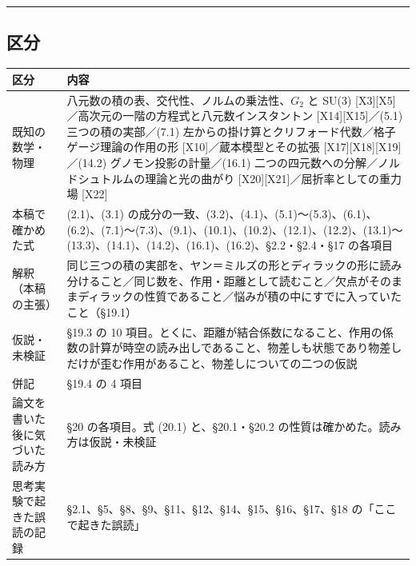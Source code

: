 \documentclass[
  a4paper,
]{ltjsarticle}
\newcounter{none} %
\begin{document}
\begin{center}\rule{0.5\linewidth}{0.5pt}\end{center}

\subsection{区分}\label{ux533aux5206}

{\def\LTcaptype{none} %
\begin{longtable}[]{@{}
  >{\raggedright\arraybackslash}p{}
  >{\raggedright\arraybackslash}p{}@{}}
\toprule\noalign{}
\begin{minipage}[b]{\linewidth}\raggedright
区分
\end{minipage} & \begin{minipage}[b]{\linewidth}\raggedright
内容
\end{minipage} \\
\midrule\noalign{}
\endhead
\bottomrule\noalign{}
\endlastfoot
既知の数学・物理 & 八元数の積の表、交代性、ノルムの乗法性、\(G_2\) と
SU(3) {[}X3{]}{[}X5{]}／高次元の一階の方程式と八元数インスタントン
{[}X14{]}{[}X15{]}／(5.1) 三つの積の実部／(7.1)
左からの掛け算とクリフォード代数／格子ゲージ理論の作用の形
{[}X10{]}／蔵本模型とその拡張 {[}X17{]}{[}X18{]}{[}X19{]}／(14.2)
グノモン投影の計量／(16.1)
二つの四元数への分解／ノルドシュトルムの理論と光の曲がり
{[}X20{]}{[}X21{]}／屈折率としての重力場 {[}X22{]} \\
本稿で確かめた式 & (2.1)、(3.1)
の成分の一致、(3.2)、(4.1)、(5.1)〜(5.3)、(6.1)、(6.2)、(7.1)〜(7.3)、(9.1)、(10.1)、(10.2)、(12.1)、(12.2)、(13.1)〜(13.3)、(14.1)、(14.2)、(16.1)、(16.2)、§2.2・§2.4・§17
の各項目 \\
解釈（本稿の主張） &
同じ三つの積の実部を、ヤン＝ミルズの形とディラックの形に読み分けること／同じ数を、作用・距離として読むこと／欠点がそのままディラックの性質であること／悩みが積の中にすでに入っていたこと（§19.1） \\
仮説・未検証 & §19.3 の 10
項目。とくに、距離が結合係数になること、作用の係数の計算が時空の読み出しであること、物差しも状態であり物差しだけが歪む作用があること、物差しについての二つの仮説 \\
併記 & §19.4 の 4 項目 \\
論文を書いた後に気づいた読み方 & §20 の各項目。式 (20.1)
と、§20.1・§20.2 の性質は確かめた。読み方は仮説・未検証 \\
思考実験で起きた誤読の記録 &
§2.1、§5、§8、§9、§11、§12、§14、§15、§16、§17、§18
の「ここで起きた誤読」 \\
\end{longtable}
}
\end{document}
